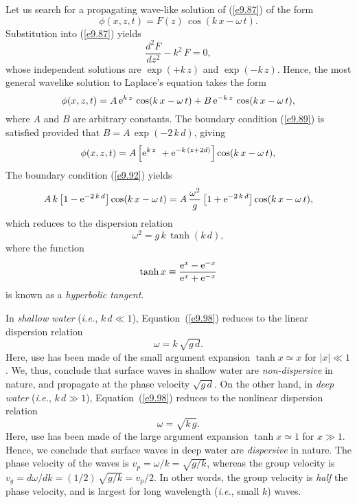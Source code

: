 Let us search for a propagating wave-like solution of (\ref{e9.87}) of the form
\begin{equation}
\phi(x,z,t) = F(z)\,\cos(k\,x-\omega\,t).
\end{equation}
Substitution into (\ref{e9.87}) yields
\begin{equation}
\frac{d^2 F}{dz^2} - k^2\,F= 0,
\end{equation}
whose independent solutions are $\exp(+k\,z)$ and $\exp(-k\,z)$.
Hence, the most general wavelike solution to Laplace's equation takes the form
\begin{equation}
\phi(x,z,t) = A\,{\rm e}^{k\,z}\,\cos(k\,x-\omega\,t) + B\,{\rm e}^{-k\,z}\,\cos(k\,x-\omega\,t),
\end{equation}
where $A$ and $B$ are arbitrary constants. The boundary condition (\ref{e9.89})
is satisfied provided that $B = A\,\exp(-2\,k\,d)$, giving
\begin{equation}\label{e9.96}
\phi(x,z,t) = A\left[{\rm e}^{k\,z}\ + {\rm e}^{-k\,(z+2d)}\right]\cos(k\,x-\omega\,t),
\end{equation}
The boundary condition (\ref{e9.92}) yields
\begin{equation}
A\,k\left[1-{\rm e}^{-2\,k\,d}\right]\cos(k\,x-\omega\,t) = A\,\frac{\omega^2}{g}\left[1+{\rm e}^{-2\,k\,d}\right]\cos(k\,x-\omega\,t),
\end{equation}
which reduces to the dispersion relation 
\begin{equation}\label{e9.98}
\omega^2 = g\,k\,\tanh(k\,d),
\end{equation}
where the function
\begin{equation}
\tanh x \equiv \frac{{\rm e}^x- {\rm e}^{-x}}{{\rm e}^{x}+ {\rm e}^{-x}}
\end{equation}
is known as a {\em hyperbolic tangent}.

In {\em shallow water}\/ ({\em i.e.}, $k\,d\ll 1$), Equation~(\ref{e9.98}) reduces to
the linear dispersion relation
\begin{equation}
\omega = k\,\sqrt{g\,d}.
\end{equation}
Here, use has been made of the small argument expansion $\tanh x\simeq x$ for $|x|\ll 1$. 
We, thus, conclude that surface waves in shallow water are {\em non-dispersive}\/ in nature, and
propagate at the phase velocity $\sqrt{g\,d}$. On the other hand, in {\em deep water}\/ ({\em i.e.}, $k\,d\gg 1$), Equation~(\ref{e9.98}) reduces to
the nonlinear dispersion relation
\begin{equation}
\omega = \sqrt{k\,g}.
\end{equation}
Here, use has been made of the large argument expansion $\tanh x\simeq 1$ for $x\gg 1$. 
Hence, we conclude that surface waves in deep water are {\em dispersive}\/ in nature. The
phase velocity of the waves is $v_p=\omega/k = \sqrt{g/k}$, whereas the
group velocity is $v_g=d\omega/dk = (1/2)\,\sqrt{g/k}= v_p/2$. In other
words, the group velocity is {\em half}\/ the phase velocity, and is largest for long wavelength
({\em i.e.}, small $k$) waves. 

